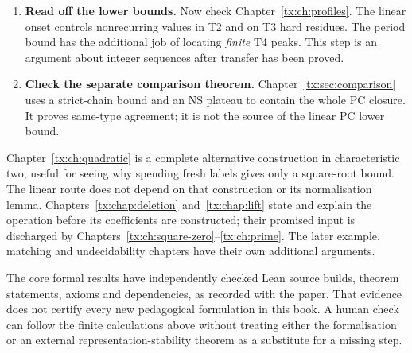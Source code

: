 \begin{enumerate}
The pairing doubles the original monomial support $kd$.
\item \textbf{Read off the lower bounds.}
Now check Chapter~\ref{tx:ch:profiles}. The linear onset controls
nonrecurring values in T2 and on T3 hard residues. The period bound
has the additional job of locating \emph{finite} T4 peaks. This step
is an argument about integer sequences after transfer has been proved.
\item \textbf{Check the separate comparison theorem.}
Chapter~\ref{tx:sec:comparison} uses a strict-chain bound and an NS
plateau to contain the whole PC closure. It proves same-type agreement;
it is not the source of the linear PC lower bound.
\end{enumerate}

Chapter~\ref{tx:ch:quadratic} is a complete alternative construction in
characteristic two, useful for seeing why spending fresh labels gives
only a square-root bound. The linear route does not depend on that
construction or its normalisation lemma. Chapters~\ref{tx:chap:deletion}
and~\ref{tx:chap:lift} state and explain the operation before its
coefficients are constructed; their promised input is discharged by
Chapters~\ref{tx:ch:square-zero}--\ref{tx:ch:prime}.
The later example, matching and undecidability chapters have their own
additional arguments.

The core formal results have independently checked Lean source builds,
theorem statements, axioms and dependencies, as recorded with the paper.
That evidence does not certify every new pedagogical formulation in this
book. A human check can follow the finite calculations above without
treating either the formalisation or an external representation-stability
theorem as a substitute for a missing step.

